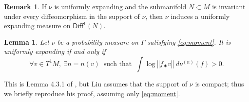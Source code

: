 \documentclass[11pt]{article}
\newcommand{\norm}[1]{{\left\Vert#1\right\Vert}}
\newcommand\Diff{{\mathsf{Diff}}}
\theoremstyle{plain}
\newtheorem{lem}[thm]{Lemma}
\theoremstyle{definition}
\newtheorem{rem}[thm]{Remark}
\numberwithin{equation}{section}
\begin{document}
\begin{rem} \label{rem:restriction_UE}
If $\nu$ is uniformly expanding and the submanifold $N\subset M$ is invariant under every diffeomorphism in the support of $\nu$,
then $\nu$ induces a uniformly expanding measure on $\Diff^1(N)$.
\end{rem}

\begin{lem}\label{lem:weak_UE}
Let $\nu$ be a probability measure on $\Gamma$ satisfying \eqref{eq:moment}.
It is uniformly expanding if and only if
\begin{equation}\label{eq:weak_UE}
\forall v\in T^1M, \ \exists n = n(v) \ \text{ such that } \
\int \log \norm{f_\varstar v } \; d\nu^{(n)}(f) >0.
\end{equation}
\end{lem}

This is Lemma 4.3.1 of \cite{liu_thesis}, but Liu assumes that the support of $\nu$ is compact; thus
we briefly reproduce his proof, assuming only \eqref{eq:moment}.
\end{document}
